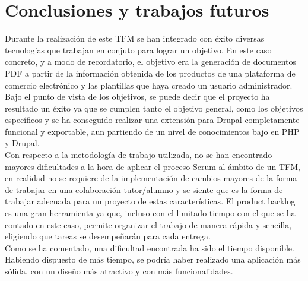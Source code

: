 \chapter{Conclusiones y trabajos futuros}

Durante la realización de este \ac{TFM} se han integrado con éxito diversas tecnologías que trabajan en conjuto para lograr un objetivo. En este caso concreto, y a modo de recordatorio, el objetivo era la generación de documentos PDF a partir de la información obtenida de los productos de una plataforma de comercio electrónico y las plantillas que haya creado un usuario administrador. Bajo el punto de vista de los objetivos, se puede decir que el proyecto ha resultado un éxito ya que se cumplen tanto el objetivo general, como los objetivos específicos y se ha conseguido realizar una extensión para Drupal completamente funcional y exportable, aun partiendo de un nivel de conocimientos bajo en PHP y Drupal.\\

Con respecto a la metodología de trabajo utilizada, no se han encontrado mayores dificultades a la hora de aplicar el proceso Scrum al ámbito de un \ac{TFM}, en realidad no se requiere de la implementación de cambios mayores de la forma de trabajar en una colaboración tutor/alumno y se siente que es la forma de trabajar adecuada para un proyecto de estas características. El product backlog es una gran herramienta ya que, incluso con el limitado tiempo con el que se ha contado en este caso, permite organizar el trabajo de manera rápida y sencilla, eligiendo que tareas se desempeñarán para cada entrega.\\

Como se ha comentado, una dificultad encontrada ha sido el tiempo disponible. Habiendo dispuesto de más tiempo, se podría haber realizado una aplicación más sólida, con un diseño más atractivo y con más funcionalidades.\\


